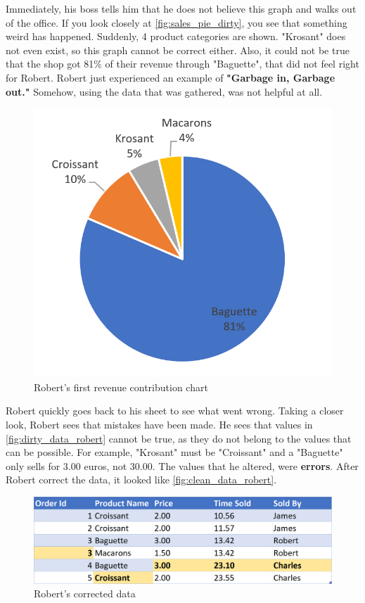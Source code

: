 Immediately, his boss tells him that he does not believe this graph and walks out of the office. 
If you look closely at \autoref{fig:sales_pie_dirty}, you see that something weird has happened. Suddenly, 4 product categories are shown. "Krosant" does not even exist, so this graph cannot be correct either. Also, it could not be true that the shop got 81\% of their revenue through "Baguette", that did not feel right for Robert. Robert just experienced an example of \textbf{"Garbage in, Garbage out."} Somehow, using the data that was gathered, was not helpful at all.

\begin{figure}[h]
    \centering
    \includegraphics[width=0.5\linewidth]{thesis/Figures/Sales_Pie_Dirty.png}
    \caption{Robert's first revenue contribution chart}
    \label{fig:sales_pie_dirty}
\end{figure}

Robert quickly goes back to his sheet to see what went wrong. Taking a closer look, Robert sees that mistakes have been made. He sees that values in \autoref{fig:dirty_data_robert} cannot be true, as they do not belong to the values that can be possible. For example, "Krosant" must be "Croissant" and a "Baguette" only sells for 3.00 euros, not 30.00. The values that he altered, were \textbf{errors}. After Robert correct the data, it looked like \autoref{fig:clean_data_robert}.

\begin{figure}[h]
    \centering
    \includegraphics[width=0.9\linewidth]{thesis/Figures/CleanDataset.png}
    \caption{Robert's corrected data}
    \label{fig:clean_data_robert}
\end{figure}

